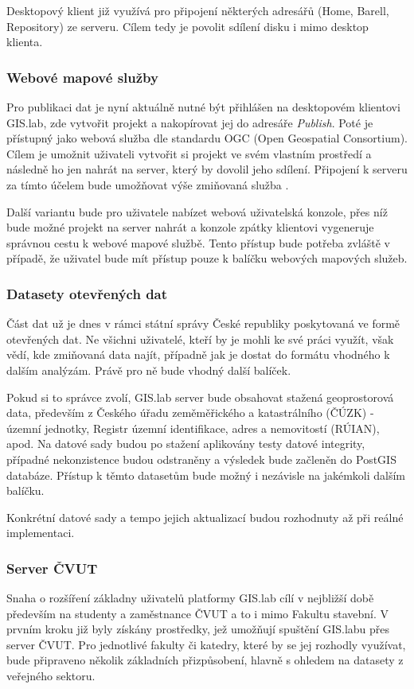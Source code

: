 Desktopový klient již  využívá pro připojení některých adresářů 
(Home, Barell, Repository) ze serveru. Cílem tedy je povolit sdílení 
disku i mimo desktop klienta.

\subsubsection{Webové mapové služby}
Pro publikaci dat je nyní aktuálně nutné být přihlášen na desktopovém
klientovi GIS.lab, zde vytvořit projekt a nakopírovat jej do adresáře
\textit{Publish}. Poté je přístupný jako webová služba dle standardu
OGC (Open Geospatial Consortium). Cílem je umožnit uživateli vytvořit
si projekt ve svém vlastním prostředí a následně ho jen nahrát na
server, který by dovolil jeho sdílení. Připojení k serveru za tímto
účelem bude umožňovat výše zmiňovaná služba .

Další variantu bude pro uživatele nabízet webová uživatelská konzole,
přes níž bude možné projekt na server nahrát a konzole zpátky
klientovi vygeneruje správnou cestu k webové mapové službě. Tento
přístup bude potřeba zvláště v případě, že uživatel bude mít přístup
pouze k balíčku webových mapových služeb.

\subsubsection{Datasety otevřených dat}

Část dat už je dnes v rámci státní správy České republiky poskytovaná ve
formě otevřených dat. Ne všichni uživatelé, kteří by je mohli ke své 
práci využít, však vědí, kde zmiňovaná
data najít, případně jak je dostat do formátu vhodného k dalším
analýzám. Právě pro ně bude vhodný další balíček.

Pokud si to správce zvolí, GIS.lab server bude obsahovat stažená
geoprostorová data, především z Českého úřadu zeměměřického a
katastrálního (ČÚZK) - územní jednotky, Registr územní identifikace,
adres a nemovitostí (RÚIAN), apod. Na datové sady budou po stažení
aplikovány testy datové integrity, případné nekonzistence budou
odstraněny a výsledek bude začleněn do PostGIS databáze. Přístup 
k těmto datasetům bude možný i nezávisle na jakémkoli dalším balíčku.

Konkrétní datové sady a tempo jejich aktualizací budou rozhodnuty až
při reálné implementaci.

\subsubsection{Server ČVUT}
Snaha o rozšíření základny uživatelů platformy GIS.lab cílí v
nejbližší době především na studenty a zaměstnance ČVUT a to i mimo Fakultu
stavební. V prvním kroku již byly získány prostředky, jež umožňují
spuštění GIS.labu přes server ČVUT. Pro jednotlivé fakulty či katedry,
které by se jej rozhodly využívat, bude připraveno několik základních
přizpůsobení, hlavně s ohledem na datasety z veřejného sektoru.

